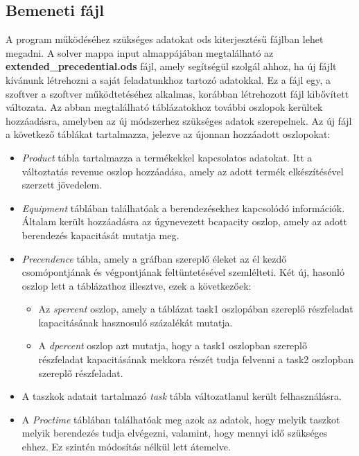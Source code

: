 \subsection{Bemeneti fájl}
A program működéséhez szükséges adatokat ods kiterjesztésű fájlban lehet megadni.
A solver mappa input almappájában megtalálható az \textbf{extended\_precedential.ods} fájl, amely segítségül szolgál ahhoz, ha új fájlt kívánunk létrehozni a saját feladatunkhoz tartozó adatokkal.
Ez a fájl egy, a szoftver a szoftver működtetéséhez alkalmas, korábban létrehozott fájl kibővített változata.
Az abban megtalálható táblázatokhoz további oszlopok kerültek hozzáadásra, amelyben az új módszerhez szükséges adatok szerepelnek.
Az új fájl a következő táblákat tartalmazza, jelezve az újonnan hozzáadott oszlopokat:
\begin{itemize}
  \item \textit{Product} tábla tartalmazza a termékekkel kapcsolatos adatokat.
  Itt a változtatás revenue oszlop hozzáadása, amely az adott termék elkészítésével szerzett jövedelem.
  \item \textit{Equipment} táblában találhatóak a berendezésekhez kapcsolódó információk.
  Általam került hozzáadásra az úgynevezett b\textunderscore capacity oszlop, amely az adott berendezés kapacitását mutatja meg.
  \item \textit{Precendence} tábla, amely a gráfban szereplő éleket az él kezdő csomópontjának és végpontjának feltüntetésével szemlélteti.
  Két új, hasonló oszlop lett a táblázathoz illesztve, ezek a következőek:
  	\begin{itemize}
  		\item Az \textit{s\textunderscore percent} oszlop, amely a táblázat task1 oszlopában szereplő részfeladat kapacitásának hasznosuló százalékát mutatja.
  		\item A \textit{d\textunderscore percent} oszlop  azt mutatja, hogy a task1 oszlopban szereplő részfeladat kapacitásának mekkora részét tudja felvenni a task2 oszlopban szereplő részfeladat.
  	\end{itemize}
  	\item A taszkok adatait tartalmazó \textit{task} tábla változatlanul került felhasználásra.
  	\item A \textit{Proctime} táblában találhatóak meg azok az adatok, hogy melyik taszkot melyik berendezés tudja elvégezni, valamint, hogy mennyi idő szükséges ehhez.
  	Ez szintén módosítás nélkül lett átemelve.
\end{itemize}

